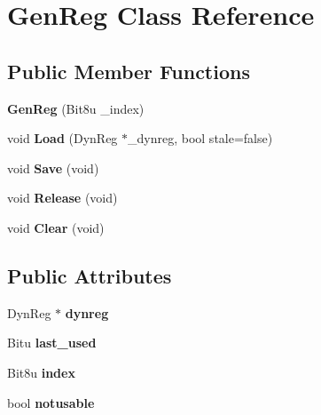 \hypertarget{classGenReg}{\section{Gen\-Reg Class Reference}
\label{classGenReg}
}
\subsection*{Public Member Functions}
\begin{DoxyCompactItemize}
\item 
\hypertarget{classGenReg_a5c1c505a174bfeba1853c8d6536a884f}{{\bfseries Gen\-Reg} (Bit8u \-\_\-index)}\label{classGenReg_a5c1c505a174bfeba1853c8d6536a884f}

\item 
\hypertarget{classGenReg_ad6e014006c8b369d15156bff0c9a1516}{void {\bfseries Load} (Dyn\-Reg $\ast$\-\_\-dynreg, bool stale=false)}\label{classGenReg_ad6e014006c8b369d15156bff0c9a1516}

\item 
\hypertarget{classGenReg_a01923fb6ef0d64b8d352da5e28e98893}{void {\bfseries Save} (void)}\label{classGenReg_a01923fb6ef0d64b8d352da5e28e98893}

\item 
\hypertarget{classGenReg_aa5bd93301c69e9ff067faa27cfb1ddd6}{void {\bfseries Release} (void)}\label{classGenReg_aa5bd93301c69e9ff067faa27cfb1ddd6}

\item 
\hypertarget{classGenReg_afe4fe3eeb256d7986c214c813d8287d8}{void {\bfseries Clear} (void)}\label{classGenReg_afe4fe3eeb256d7986c214c813d8287d8}

\end{DoxyCompactItemize}
\subsection*{Public Attributes}
\begin{DoxyCompactItemize}
\item 
\hypertarget{classGenReg_a7668517d5156d9c606fadf3193b6af06}{Dyn\-Reg $\ast$ {\bfseries dynreg}}\label{classGenReg_a7668517d5156d9c606fadf3193b6af06}

\item 
\hypertarget{classGenReg_af55ba4d20e9754213de48041471f8dff}{Bitu {\bfseries last\-\_\-used}}\label{classGenReg_af55ba4d20e9754213de48041471f8dff}

\item 
\hypertarget{classGenReg_ab74ef6a001ce748a63d534c432df6623}{Bit8u {\bfseries index}}\label{classGenReg_ab74ef6a001ce748a63d534c432df6623}

\item 
\hypertarget{classGenReg_aa6f04e79f3fb46ba7679d3a2437ae51a}{bool {\bfseries notusable}}\label{classGenReg_aa6f04e79f3fb46ba7679d3a2437ae51a}

\end{DoxyCompactItemize}


